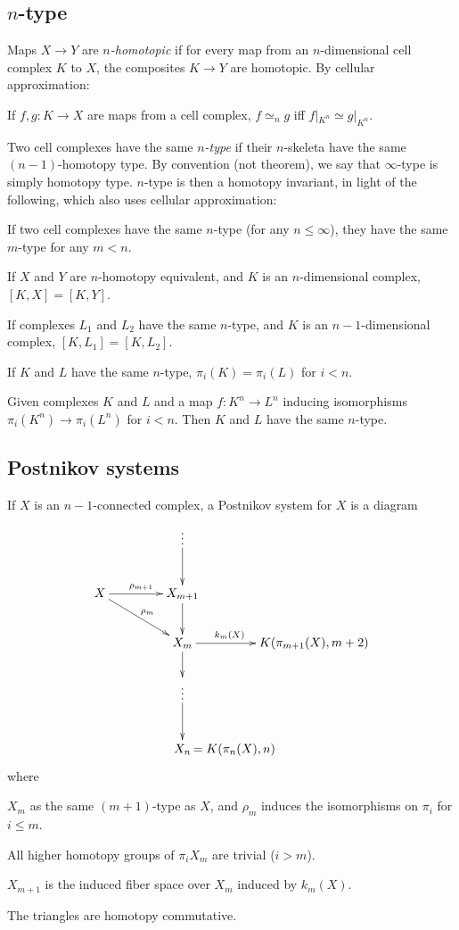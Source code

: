 \documentclass[11pt]{article}
\begin{document}
\subsection{\texorpdfstring{$n$}{n}-type}
Maps $X\to Y$ are \emph{$n$-homotopic} if for every map from an $n$-dimensional
cell complex $K$ to $X$, the composites $K\to Y$ are homotopic. By cellular
approximation:
\begin{prop*}
If $f,g:K\to X$ are maps from a cell complex, $f \simeq_n g$ iff 
$f|_{K^n}\simeq g|_{K^n}$.
\end{prop*}
Two cell complexes have the same \emph{$n$-type} if their $n$-skeleta have the
same $(n-1)$-homotopy type. By convention (not theorem), we say that
$\infty$-type is simply homotopy type. $n$-type is then a homotopy invariant, in
light of the following, which also uses cellular approximation:
\begin{prop*}
If two cell complexes have the same $n$-type (for any $n\leq\infty$), they have
the same $m$-type for any $m<n$.
\end{prop*}
\begin{lem*}
If $X$ and $Y$ are $n$-homotopy equivalent, and $K$ is an $n$-dimensional
complex, $[K,X]=[K,Y]$.
\end{lem*}
\begin{thm*}
If complexes $L_1$ and $L_2$ have the same $n$-type, and $K$ is an
$n-1$-dimensional complex, $[K,L_1]=[K,L_2]$.
\end{thm*}
\begin{cor*}
If $K$ and $L$ have the same $n$-type, $\pi_i(K)=\pi_i(L)$ for $i<n$.
\end{cor*}
\begin{thm*}[Whitehead]
Given complexes $K$ and $L$ and a map $f:K^n\to L^n$ inducing isomorphisms
$\pi_i(K^n)\to\pi_i(L^n)$ for $i<n$. Then $K$ and $L$ have the same $n$-type.
\end{thm*}

\subsection{Postnikov systems}
If $X$ is an $n-1$-connected complex, a Postnikov system for $X$ is a diagram
\[\xymatrix@C=1.5cm{
&\vdots\ar[d]\\
X\ar[r]^{\rho_{m+1}}\ar[rd]^{\rho_m}&X_{m+1}\ar[d]\\
&X_m\ar[r]^{k_m(X)\ \ \ \ \ \ \ \ \ }\ar[d]&K(\pi_{m+1}(X),m+2)\\
&\vdots\ar[d]\\
&X_n\makebox[0cm][l]{$\,=K(\pi_n(X),n)$}
}\]
where
\begin{itemise}
\item $X_m$ as the same $(m+1)$-type as $X$, and $\rho_m$ induces the
isomorphisms on $\pi_i$ for $i\leq m$.
\item All higher homotopy groups of $\pi_iX_m$ are trivial ($i>m$).
\item $X_{m+1}$ is the induced fiber space over $X_m$ induced by $k_m(X)$.
\item The triangles are homotopy commutative.
\end{itemise}
\end{document}
